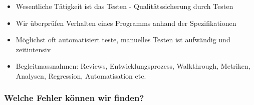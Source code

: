 \documentclass[a4paper]{article}
\begin{document}
		\begin{itemize}
			\item Wesentliche Tätigkeit ist das Testen - Qualitätssicherung durch Testen
			\item Wir überprüfen Verhalten eines Programms anhand der Spezifikationen
			\item Möglichst oft automatisiert teste, manuelles Testen ist aufwändig und zeitintensiv
			\item Begleitmassnahmen: Reviews, Entwicklungsprozess, Walkthrough, Metriken, Analysen, Regression, Automatisation etc.
		\end{itemize}
		
			\subsubsection{Welche Fehler können wir finden?}
			
\end{document}
